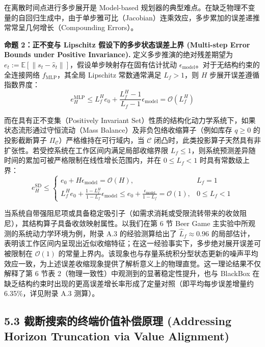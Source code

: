 \documentclass[UTF8]{ctexart}
\begin{document}
在离散时间点进行多步展开是 Model-based
规划器的典型难点。在缺乏物理不变量的自回归生成中，由于单步雅可比（Jacobian）连乘效应，多步累加的误差递推常常呈几何增长（Compounding
Errors）。

\textbf{命题 2：正不变与 Lipschitz 假设下的多步状态误差上界 (Multi-step Error Bounds under Positive Invariance). }
定义多步推演的绝对残差期望为 \( e_t := \mathbb{E}[\|s_t - \hat{s}_t\|] \)，假设单步映射存在固有估计扰动 \(\epsilon_{\text{model}}\)。对于无结构约束的全连接网络
\(f_{\text{MLP}}\)，其全局 Lipschitz 常数通常满足 \(L_f > 1\)，则 \(H\)
步展开误差遵循指数界度：
\[ e_H^{\text{MLP}} \le L_f^H e_0 + \frac{L_f^H - 1}{L_f - 1} \epsilon_{\text{model}} = \mathcal{O}(L_f^H) \]

而在具有正不变集（Positively Invariant Set）性质的结构化动力学系统下，如果状态流形通过守恒流动（Mass
Balance）及非负包络收缩算子（例如库存 \(q \ge 0\) 的投影截断算子
\(\Pi_{\mathcal{C}}\)）严格维持在可行域内，当 \(\mathcal{C}\) 闭凸时，此类投影算子天然具有非扩张性。若受控系统在工作区间内满足局部收缩界限 \(L_f \le 1\)，则系统预测差异随时间的累加可被严格限制在线性增长范围内，并在 \(0 \le L_f < 1\) 时具有常数级上界：
\[
e_H^{\text{SD}} \le 
\begin{cases}
e_0 + H\epsilon_{\text{model}} = \mathcal{O}(H), & L_f = 1 \\
L_f^H e_0 + \frac{1 - L_f^H}{1 - L_f} \epsilon_{\text{model}} \le e_0 + \frac{\epsilon_{\text{model}}}{1 - L_f} = \mathcal{O}(1), & 0 \le L_f < 1
\end{cases}
\]

当系统自带强阻尼项或具备稳定吸引子（如需求消耗或受限流转带来的收敛阻尼），其结构算子具备收敛映射属性。以我们在第
6 节 Beer Game 主实验中所观测的系统动力学环境为例，附录 A.3 的经验测算给出了 \(\hat L_f \approx 0.96\) 的局部估计，表明该工作区间内呈现出近似收缩特征；在这一经验事实下，多步绝对展开误差可被限制在 \(\mathcal{O}(1)\)
的常量上界内。该现象也与存量系统积分型状态更新的噪声平均效应一致，为上述误差收缩现象提供了解析意义上的物理直觉。这一理论结果不仅解释了第 6 节表 2（物理一致性）中观测到的显著稳定性提升，也与 BlackBox 在缺乏结构约束时出现的更高误差增长率形成了定量对照（即平均每步误差增量约 6.35\%，详见附录 A.3 测算）。

\hypertarget{ux957fux89c6ux91ceux622aux65adux8865ux507fux539fux7406-addressing-horizon-truncation-via-value-alignment}{%
\subsection{5.3 截断搜索的终端价值补偿原理 (Addressing Horizon Truncation via Value Alignment)}\label{ux957fux89c6ux91ceux622aux65adux8865ux507fux539fux7406-addressing-horizon-truncation-via-value-alignment}}
\end{document}
